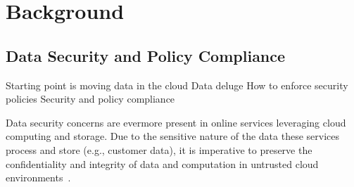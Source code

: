 \section{Background}
\label{sec:background}
%

\subsection{Data Security and Policy Compliance}
Starting point is moving data in the cloud
Data deluge
How to enforce security policies
Security and policy compliance
\fi

Data security concerns are evermore present in online services leveraging cloud computing and storage. Due to the sensitive nature of the data these services process and store (e.g., customer data), it is imperative to preserve the confidentiality and integrity of data and computation in untrusted cloud environments~\cite{databreaches}.

